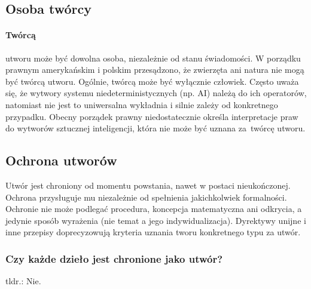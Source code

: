 \documentclass{article}
\begin{document}
\subsection{Osoba twórcy}

\paragraph{Twórcą}

utworu może być dowolna osoba, niezależnie od stanu świadomości.
W porządku prawnym amerykańskim i polskim przesądzono, że zwierzęta ani natura nie mogą być twórcą utworu.
Ogólnie, twórcą może być wyłącznie człowiek.
Często uważa się, że wytwory systemu niedeterministycznych (np. AI) należą do ich operatorów,
natomiast nie jest to uniwersalna wykładnia i silnie zależy od konkretnego przypadku.
Obecny porządek prawny niedostatecznie określa interpretacje praw do wytworów sztucznej inteligencji,
która nie może być uznana za~twórcę utworu.

\subsection{Ochrona utworów}

Utwór jest chroniony od momentu powstania, nawet w postaci nieukończonej.
Ochrona przysługuje mu niezależnie od spełnienia jakichkolwiek formalności.
Ochronie nie może podlegać procedura, koncepcja matematyczna ani odkrycia,
a jedynie sposób wyrażenia (nie temat a jego indywidualizacja).
Dyrektywy unijne i inne przepisy doprecyzowują kryteria uznania tworu konkretnego typu za utwór.

\subsubsection{Czy każde dzieło jest chronione jako utwór?}

tldr.: Nie.
\end{document}
